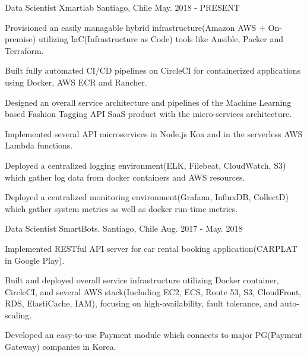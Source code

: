 

\begin{cventries}

  \cventry
    {Data Scientist} %
    {Xmartlab} %
    {Santiago, Chile} %
    {May. 2018 - PRESENT} %
    {
      \begin{cvitems} %
        \item {Provisioned an easily managable hybrid infrastructure(Amazon AWS + On-premise) utilizing IaC(Infrastructure as Code) tools like Ansible, Packer and Terraform.}
        \item {Built fully automated CI/CD pipelines on CircleCI for containerized applications using Docker, AWS ECR and Rancher.}
        \item {Designed an overall service architecture and pipelines of the Machine Learning based Fashion Tagging API SaaS product with the micro-services architecture.}
        \item {Implemented several API microservices in Node.js Koa and in the serverless AWS Lambda functions.}
        \item {Deployed a centralized logging environment(ELK, Filebeat, CloudWatch, S3) which gather log data from docker containers and AWS resources.}
        \item {Deployed a centralized monitoring environment(Grafana, InfluxDB, CollectD) which gather system metrics as well as docker run-time metrics.}
      \end{cvitems}
    }

  \cventry
    {Data Scientist} %
    {SmartBots.} %
    {Santiago, Chile} %
    {Aug. 2017 - May. 2018} %
    {
      \begin{cvitems} %
        \item {Implemented RESTful API server for car rental booking application(CARPLAT in Google Play).}
        \item {Built and deployed overall service infrastructure utilizing Docker container, CircleCI, and several AWS stack(Including EC2, ECS, Route 53, S3, CloudFront, RDS, ElastiCache, IAM), focusing on high-availability, fault tolerance, and auto-scaling.}
        \item {Developed an easy-to-use Payment module which connects to major PG(Payment Gateway) companies in Korea.}
      \end{cvitems}
    }


\end{cventries}
